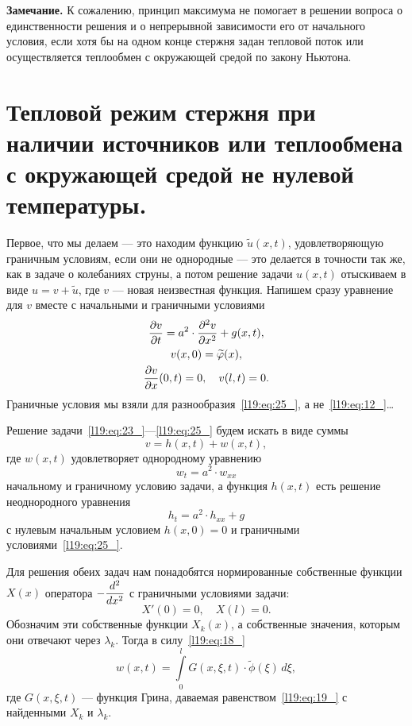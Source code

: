 \vspace{0.2cm}
\noindent\textbf{Замечание. }К сожалению, принцип максимума не помогает в решении вопроса о единственности решения и о непрерывной зависимости его от начального условия, если хотя бы на одном конце стержня задан тепловой поток или осуществляется теплообмен с окружающей средой по закону Ньютона.

\section[Решение неоднородного уравнения теплопроводности.]{Тепловой режим стержня при наличии источников или теплообмена с окружающей средой не нулевой температуры.}
\label{lecture19section4}
Первое, что мы делаем --- это находим функцию $\tilde{u}(x,t)$, удовлетворяющую граничным условиям, если они не однородные --- это делается в точности так же, как в задаче о колебаниях струны, а потом решение задачи $u(x,t)$ отыскиваем в виде $u=v+\tilde{u}$, где $v$ --- новая неизвестная функция. Напишем сразу уравнение для $v$ вместе с начальными и граничными условиями
\begin{gather}
	\frac{\partial v}{\partial t}=a^2\cdot\frac{\partial^2v}{\partial x^2}+g(x,t),\label{l19:eq:23_}\\
	v(x,0)=\widetilde{\varphi}(x),\label{l19:eq:24_}\\
	\frac{\partial v}{\partial x}(0,t)=0,\quad v(l,t)=0.\label{l19:eq:25_}
\end{gather}
Граничные условия мы взяли для разнообразия~\eqref{l19:eq:25_}, а не~\eqref{l19:eq:12_}\dots

Решение задачи~\eqref{l19:eq:23_}---\eqref{l19:eq:25_} будем искать в виде суммы 
\begin{equation}\label{l19:eq:26_}
	v=h(x,t)+w(x,t),
\end{equation} 
где $w(x,t)$ удовлетворяет однородному уравнению
\begin{equation}\label{l19:eq:27_}
	w_t=a^2\cdot w_{xx}
\end{equation}
начальному и граничному условию задачи, а функция $h(x,t)$ есть решение неоднородного уравнения
\begin{equation}\label{l19:eq:28_}
	h_t=a^2\cdot h_{xx}+g
\end{equation}
с нулевым начальным условием $h(x,0)=0$ и граничными условиями~\eqref{l19:eq:25_}.

Для решения обеих задач нам понадобятся нормированные собственные функции $X(x)$ оператора $\displaystyle-\frac{d^2}{dx^2}$ с граничными условиями задачи:
\begin{equation*}
	X'(0)=0,\quad X(l)=0.
\end{equation*}
Обозначим эти собственные функции $X_k(x)$, а собственные значения, которым они отвечают через $\lambda_k$. Тогда в силу~\eqref{l19:eq:18_}
\begin{equation}\label{l19:eq:29_}
	w(x,t)=\int\limits_0^l G(x,\xi,t)\cdot\widetilde{\phi}(\xi)\,d\xi,
\end{equation}
где $G(x,\xi,t)$ --- функция Грина, даваемая равенством~\eqref{l19:eq:19_} с найденными $X_k$ и $\lambda_k$.

